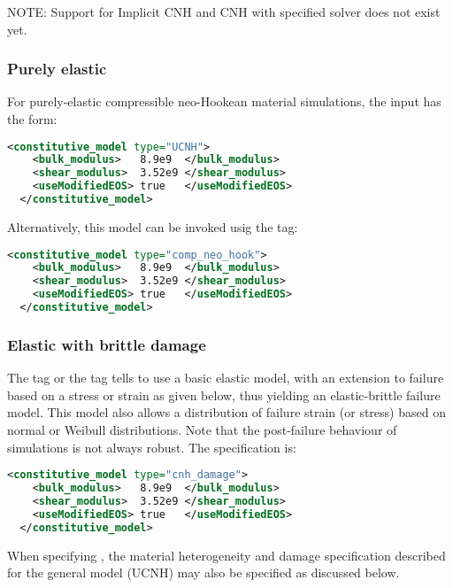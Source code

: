 \begin{NoteBox}
NOTE: Support for Implicit CNH and CNH with specified solver does not exist yet.
\end{NoteBox}

\subsubsection{Purely elastic}
For purely-elastic compressible neo-Hookean material simulations, the input has the form:
\begin{lstlisting}[language=XML]
  <constitutive_model type="UCNH"> 
    <bulk_modulus>   8.9e9  </bulk_modulus>
    <shear_modulus>  3.52e9 </shear_modulus>
    <useModifiedEOS> true   </useModifiedEOS>
  </constitutive_model>
\end{lstlisting}
Alternatively, this model can be invoked usig the  tag:
\begin{lstlisting}[language=XML]
  <constitutive_model type="comp_neo_hook"> 
    <bulk_modulus>   8.9e9  </bulk_modulus>
    <shear_modulus>  3.52e9 </shear_modulus>
    <useModifiedEOS> true   </useModifiedEOS>
  </constitutive_model>
\end{lstlisting}

\subsubsection{Elastic with brittle damage}
The  tag or the  tag
tells \Vaango to use a basic elastic model, with an extension
to failure based on a stress or strain as given below, thus yielding an
elastic-brittle failure model.  This model also allows a distribution
of failure strain (or stress) based on normal or Weibull distributions.
Note that the post-failure behaviour of simulations is not always robust.
The specification is:
\begin{lstlisting}[language=XML]
  <constitutive_model type="cnh_damage"> 
    <bulk_modulus>   8.9e9  </bulk_modulus>
    <shear_modulus>  3.52e9 </shear_modulus>
    <useModifiedEOS> true   </useModifiedEOS>
  </constitutive_model>
\end{lstlisting}
When specifying , the material heterogeneity and damage 
specification described for the general model (UCNH) may also be specified
as discussed below.

